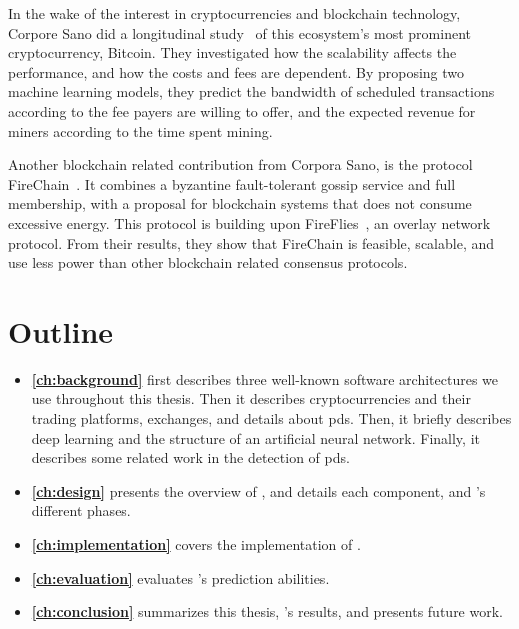 In the wake of the interest in cryptocurrencies and blockchain technology, Corpore Sano did a longitudinal study~\cite{tedeschi2017trading} of this ecosystem's most prominent cryptocurrency, Bitcoin. They investigated how the scalability affects the performance, and how the costs and fees are dependent. By proposing two machine learning models, they predict the bandwidth of scheduled transactions according to the fee payers are willing to offer, and the expected revenue for miners according to the time spent mining.

Another blockchain related contribution from Corpora Sano, is the protocol FireChain~\cite{mikalsen2018firechain}. It combines a byzantine fault-tolerant gossip service and full membership, with a proposal for blockchain systems that does not consume excessive energy. This protocol is building upon FireFlies~\cite{johansen2015fireflies}, an overlay network protocol. From their results, they show that FireChain is feasible, scalable, and use less power than other blockchain related consensus protocols.

\section{Outline}\label{sec:outline}
\begin{itemize}
    \item[] \textbf{\autoref{ch:background}} first describes three well-known software architectures we use throughout this thesis. Then it describes cryptocurrencies and their trading platforms, exchanges, and details about \acp{pd}. Then, it briefly describes deep learning and the structure of an artificial neural network. Finally, it describes some related work in the detection of \acp{pd}. 
    
    \item[] \textbf{\autoref{ch:design}} presents the overview of \project, and details each component, and \project's different phases.
    
    \item[] \textbf{\autoref{ch:implementation}} covers the implementation of \project.
    
    \item[] \textbf{\autoref{ch:evaluation}} evaluates \project's prediction abilities. 
    
    \item[] \textbf{\autoref{ch:conclusion}} summarizes this thesis, \project's results, and presents future work.
 \end{itemize}